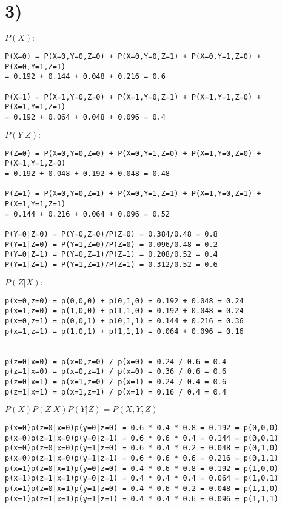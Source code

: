 \chapter{3)}
\label{3}

$P(X):$

\begin{verbatim}
P(X=0) = P(X=0,Y=0,Z=0) + P(X=0,Y=0,Z=1) + P(X=0,Y=1,Z=0) + P(X=0,Y=1,Z=1) 
= 0.192 + 0.144 + 0.048 + 0.216 = 0.6 

P(X=1) = P(X=1,Y=0,Z=0) + P(X=1,Y=0,Z=1) + P(X=1,Y=1,Z=0) + P(X=1,Y=1,Z=1) 
= 0.192 + 0.064 + 0.048 + 0.096 = 0.4
\end{verbatim}

$P(Y|Z):$

\begin{verbatim}
P(Z=0) = P(X=0,Y=0,Z=0) + P(X=0,Y=1,Z=0) + P(X=1,Y=0,Z=0) + P(X=1,Y=1,Z=0) 
= 0.192 + 0.048 + 0.192 + 0.048 = 0.48 

P(Z=1) = P(X=0,Y=0,Z=1) + P(X=0,Y=1,Z=1) + P(X=1,Y=0,Z=1) + P(X=1,Y=1,Z=1) 
= 0.144 + 0.216 + 0.064 + 0.096 = 0.52

P(Y=0|Z=0) = P(Y=0,Z=0)/P(Z=0) = 0.384/0.48 = 0.8
P(Y=1|Z=0) = P(Y=1,Z=0)/P(Z=0) = 0.096/0.48 = 0.2 
P(Y=0|Z=1) = P(Y=0,Z=1)/P(Z=1) = 0.208/0.52 = 0.4 
P(Y=1|Z=1) = P(Y=1,Z=1)/P(Z=1) = 0.312/0.52 = 0.6
\end{verbatim}

$P(Z|X):$

\begin{verbatim}
p(x=0,z=0) = p(0,0,0) + p(0,1,0) = 0.192 + 0.048 = 0.24
p(x=1,z=0) = p(1,0,0) + p(1,1,0) = 0.192 + 0.048 = 0.24
p(x=0,z=1) = p(0,0,1) + p(0,1,1) = 0.144 + 0.216 = 0.36
p(x=1,z=1) = p(1,0,1) + p(1,1,1) = 0.064 + 0.096 = 0.16


p(z=0|x=0) = p(x=0,z=0) / p(x=0) = 0.24 / 0.6 = 0.4
p(z=1|x=0) = p(x=0,z=1) / p(x=0) = 0.36 / 0.6 = 0.6
p(z=0|x=1) = p(x=1,z=0) / p(x=1) = 0.24 / 0.4 = 0.6
p(z=1|x=1) = p(x=1,z=1) / p(x=1) = 0.16 / 0.4 = 0.4
\end{verbatim}

$P(X)P(Z|X)P(Y|Z) = P(X,Y,Z)$

\begin{verbatim}
p(x=0)p(z=0|x=0)p(y=0|z=0) = 0.6 * 0.4 * 0.8 = 0.192 = p(0,0,0) 
p(x=0)p(z=1|x=0)p(y=0|z=1) = 0.6 * 0.6 * 0.4 = 0.144 = p(0,0,1)
p(x=0)p(z=0|x=0)p(y=1|z=0) = 0.6 * 0.4 * 0.2 = 0.048 = p(0,1,0)
p(x=0)p(z=1|x=0)p(y=1|z=1) = 0.6 * 0.6 * 0.6 = 0.216 = p(0,1,1)
p(x=1)p(z=0|x=1)p(y=0|z=0) = 0.4 * 0.6 * 0.8 = 0.192 = p(1,0,0) 
p(x=1)p(z=1|x=1)p(y=0|z=1) = 0.4 * 0.4 * 0.4 = 0.064 = p(1,0,1)
p(x=1)p(z=0|x=1)p(y=1|z=0) = 0.4 * 0.6 * 0.2 = 0.048 = p(1,1,0)
p(x=1)p(z=1|x=1)p(y=1|z=1) = 0.4 * 0.4 * 0.6 = 0.096 = p(1,1,1)
\end{verbatim}

